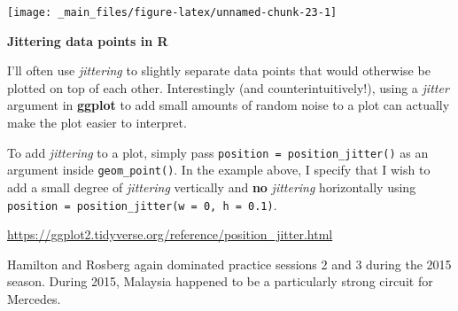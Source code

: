 \documentclass[
]{book}
\begin{document}
\begin{center}\texttt{[image: \_main\_files/figure-latex/unnamed-chunk-23-1]} \end{center}

\begin{blackbox}

\begin{center}
\textbf{Jittering data points in R}

\end{center}

I'll often use \emph{jittering} to slightly separate data points that would otherwise be plotted on top of each other. Interestingly (and counterintuitively!), using a \emph{jitter} argument in \textbf{ggplot} to add small amounts of random noise to a plot can actually make the plot easier to interpret.

To add \emph{jittering} to a plot, simply pass \texttt{position\ =\ position\_jitter()} as an argument inside \texttt{geom\_point()}. In the example above, I specify that I wish to add a small degree of \emph{jittering} vertically and \textbf{no} \emph{jittering} horizontally using \texttt{position\ =\ position\_jitter(w\ =\ 0,\ h\ =\ 0.1)}.

\url{https://ggplot2.tidyverse.org/reference/position_jitter.html}

\end{blackbox}

Hamilton and Rosberg again dominated practice sessions 2 and 3 during the 2015 season. During 2015, Malaysia happened to be a particularly strong circuit for Mercedes.
\end{document}
